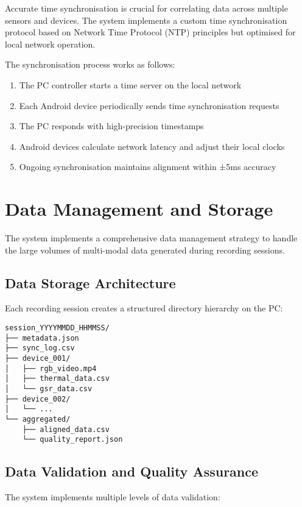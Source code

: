 Accurate time synchronisation is crucial for correlating data across multiple sensors and devices. The system implements a custom time synchronisation protocol based on Network Time Protocol (NTP) principles but optimised for local network operation.

The synchronisation process works as follows:

\begin{enumerate}
\item The PC controller starts a time server on the local network
\item Each Android device periodically sends time synchronisation requests
\item The PC responds with high-precision timestamps
\item Android devices calculate network latency and adjust their local clocks
\item Ongoing synchronisation maintains alignment within ±5ms accuracy
\end{enumerate}

\section{Data Management and Storage}

The system implements a comprehensive data management strategy to handle the large volumes of multi-modal data generated during recording sessions.

\subsection{Data Storage Architecture}

Each recording session creates a structured directory hierarchy on the PC:

\begin{verbatim}
session_YYYYMMDD_HHMMSS/
├── metadata.json
├── sync_log.csv
├── device_001/
│   ├── rgb_video.mp4
│   ├── thermal_data.csv
│   └── gsr_data.csv
├── device_002/
│   └── ...
└── aggregated/
    ├── aligned_data.csv
    └── quality_report.json
\end{verbatim}

\subsection{Data Validation and Quality Assurance}

The system implements multiple levels of data validation:

